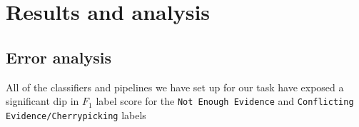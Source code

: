 
\section{Results and analysis}
\label{sec:results}

\subsection{Error analysis}
All of the classifiers and pipelines we have set up for our task have exposed a significant dip in $F_1$ label score for the \texttt{Not Enough Evidence} and \texttt{Conflicting Evidence/Cherrypicking} labels
